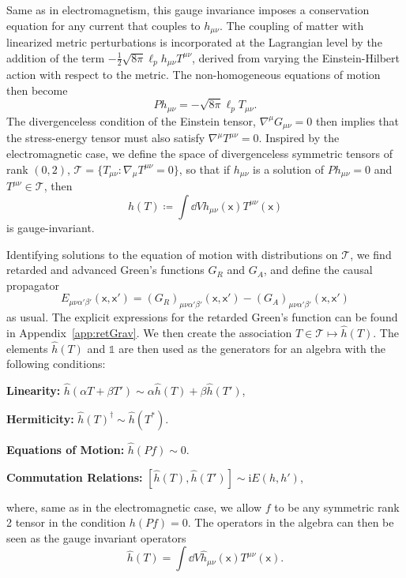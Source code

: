 \documentclass[letterpaper,12pt,titlepage,oneside,final]{book}
\newcommand{\openone}{\mathds{1}}
\newcommand{\mf}{\mathsf}%
\newcommand{\ii}{\mathrm{i}}
\begin{document}
Same as in electromagnetism, this gauge invariance imposes a conservation equation for any current that couples to $h_{\mu\nu}$. The coupling of matter with linearized metric perturbations is incorporated at the Lagrangian level by the addition of the term $- \frac{1}{2} \sqrt{8\pi} \ell_p h_{\mu\nu} T^{\mu\nu}$, derived from varying the Einstein-Hilbert action with respect to the metric. The non-homogeneous equations of motion then become
\begin{equation}\label{eq:hmunueom}
    Ph_{\mu\nu} = -\sqrt{8 \pi} \ell_p T_{\mu\nu}.
\end{equation}
The divergenceless condition of the Einstein tensor, $\nabla^\mu G_{\mu\nu} = 0$ then implies that the stress-energy tensor must also satisfy $\nabla^\mu T^{\mu\nu} = 0$. Inspired by the electromagnetic case, we define the space of divergenceless symmetric tensors of rank $(0,2)$, $\mathcal{T} = \{T_{\mu\nu}:\nabla_\mu T^{\mu\nu} = 0\}$, so that if $h_{\mu\nu}$ is a solution of $Ph_{\mu\nu} = 0$ and $T^{\mu\nu}\in \mathcal{T}$, then
\begin{equation}
    h(T) \coloneqq \int \dd V h_{\mu\nu}(\mf x) T^{\mu\nu}(\mf x)
\end{equation}
is gauge-invariant. 

Identifying solutions to the equation of motion with distributions on $\mathcal{T}$, we find retarded and advanced Green's functions $G_R$ and $G_A$, and define the causal propagator
\begin{equation}
    E_{\mu\nu\alpha'\beta'}(\mf x,\mf x') = (G_R)_{\mu\nu\alpha'\beta'}(\mf x, \mf x') - (G_A)_{\mu\nu\alpha'\beta'}(\mf x, \mf x')
\end{equation}
as usual. The explicit expressions for the retarded Green's function can be found in Appendix~\ref{app:retGrav}. We then create the association $T\in\mathcal{T}\mapsto \hat{h}(T)$. The elements $\hat{h}(T)$ and $\openone$ are then used as the generators for an algebra with the following conditions:

\noindent \textbf{Linearity:} $\hat{h}(\alpha T + \beta T') \sim \alpha \hat{h}(T) + \beta \hat{h}(T')$,

\noindent \textbf{Hermiticity:} $\hat{h}(T)^\dagger \sim \hat{h}(T^*)$.

\noindent \textbf{Equations of Motion:} $\hat{h}(Pf) \sim 0$.

\noindent \textbf{Commutation Relations:} $[\hat{h}(T),\hat{h}(T')] \sim \ii E(h,h')$,

\noindent where, same as in the electromagnetic case, we allow $f$ to be any symmetric rank 2 tensor in the condition $h(Pf) = 0$. The operators in the algebra can then be seen as the gauge invariant operators
\begin{equation}
    \hat{h}(T) = \int \dd V \hat{h}_{\mu\nu}(\mf x) T^{\mu\nu}(\mf x).
\end{equation}
\end{document}
